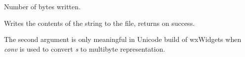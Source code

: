


Number of bytes written.


\label{wxffilewrites}


Writes the contents of the string to the file, returns \true on success.

The second argument is only meaningful in Unicode build of wxWidgets when
{\it conv} is used to convert {\it s} to multibyte representation.


